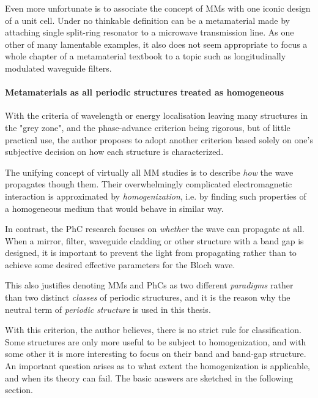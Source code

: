Even more unfortunate is to associate the concept of MMs with one iconic design of a unit cell. Under no thinkable definition can be a metamaterial made by attaching single split-ring resonator to a microwave transmission line. As one other of many lamentable examples, it also does not seem appropriate to focus a whole chapter of a metamaterial textbook %
to a topic such as longitudinally modulated waveguide filters.

\paragraph{Metamaterials as all periodic structures treated as homogeneous} %
With the criteria of wavelength or energy localisation leaving many structures in the "grey zone", and the phase-advance criterion being rigorous, but of little practical use, the author proposes to adopt another criterion based solely on one's subjective decision on how each structure is characterized. 

The unifying concept of virtually all MM studies is to describe \textit{how} the wave propagates though them. Their overwhelmingly complicated electromagnetic interaction is approximated by \textit{homogenization}, i.e. by finding such properties of a homogeneous medium that would behave in similar way.

In contrast, the PhC research focuses on \textit{whether} the wave can propagate at all. When a mirror, filter, waveguide cladding or other structure with a band gap is designed, it is important to prevent the light from propagating rather than to achieve some desired effective parameters for the Bloch wave. 

This also justifies denoting MMs and PhCs as two different \textit{paradigms} rather than two distinct \textit{classes} of periodic structures, and it is the reason why the neutral term of \textit{periodic structure} is used in this thesis. 

With this criterion, the author believes, there is no strict rule for classification. Some structures are only more useful to be subject to homogenization, and with some other it is more interesting to focus on their band and band-gap structure. 
An important question arises as to what extent the homogenization is applicable, and when its theory can fail. The basic answers are sketched in the following section.


